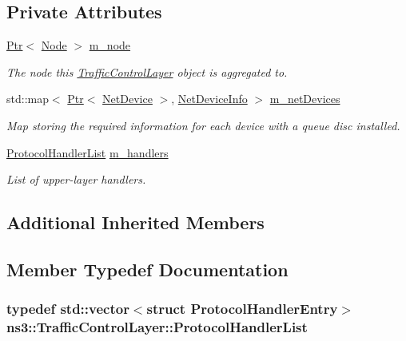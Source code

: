 \subsection*{Private Attributes}
\begin{DoxyCompactItemize}
\item 
\hyperlink{classns3_1_1Ptr}{Ptr}$<$ \hyperlink{classns3_1_1Node}{Node} $>$ \hyperlink{classns3_1_1TrafficControlLayer_a6892507af633ef1fb7e1e0a50b54f0f2}{m\+\_\+node}
\begin{DoxyCompactList}\small\item\em The node this \hyperlink{classns3_1_1TrafficControlLayer}{Traffic\+Control\+Layer} object is aggregated to. \end{DoxyCompactList}\item 
std\+::map$<$ \hyperlink{classns3_1_1Ptr}{Ptr}$<$ \hyperlink{classns3_1_1NetDevice}{Net\+Device} $>$, \hyperlink{classns3_1_1TrafficControlLayer_1_1NetDeviceInfo}{Net\+Device\+Info} $>$ \hyperlink{classns3_1_1TrafficControlLayer_a78320d2a2610f730984ca796ed51a495}{m\+\_\+net\+Devices}
\begin{DoxyCompactList}\small\item\em Map storing the required information for each device with a queue disc installed. \end{DoxyCompactList}\item 
\hyperlink{classns3_1_1TrafficControlLayer_a4cb25dc01a0f3b99c59c42bf77404247}{Protocol\+Handler\+List} \hyperlink{classns3_1_1TrafficControlLayer_a598f6f4d4efa5e776abfe6c0c3af65fa}{m\+\_\+handlers}
\begin{DoxyCompactList}\small\item\em List of upper-\/layer handlers. \end{DoxyCompactList}\end{DoxyCompactItemize}
\subsection*{Additional Inherited Members}


\subsection{Member Typedef Documentation}
\subsubsection[{\texorpdfstring{Protocol\+Handler\+List}{ProtocolHandlerList}}]{\setlength{\rightskip}{0pt plus 5cm}typedef std\+::vector$<$struct {\bf Protocol\+Handler\+Entry}$>$ {\bf ns3\+::\+Traffic\+Control\+Layer\+::\+Protocol\+Handler\+List}\hspace{0.3cm}{\ttfamily [private]}}\hypertarget{classns3_1_1TrafficControlLayer_a4cb25dc01a0f3b99c59c42bf77404247}{}\label{classns3_1_1TrafficControlLayer_a4cb25dc01a0f3b99c59c42bf77404247}


